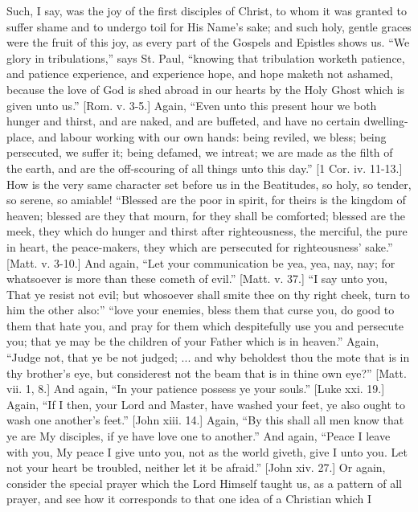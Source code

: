 Such, I say, was the joy of the first disciples of Christ, to whom
it was granted to suffer shame and to undergo toil for His Name's
sake; and such holy, gentle graces were the fruit of this joy, as
every part of the Gospels and Epistles shows us. ``We glory in
tribulations,'' says St. Paul, ``knowing that tribulation
worketh patience, and patience experience, and experience hope, and
hope maketh not ashamed, because the love of God is shed abroad in our
hearts by the Holy Ghost which is given unto us.'' [Rom. v. 3-5.]
Again, ``Even unto this present hour we both hunger and thirst,
and are naked, and are buffeted, and have no certain dwelling-place,
and labour working with our own hands: being reviled, we bless; being
persecuted, we suffer it; being defamed, we intreat; we are made as
the filth of the earth, and are the off-scouring of all things unto
this day.'' [1 Cor. iv. 11-13.] How is the very same character set
before us in the Beatitudes, so holy, so tender, so serene, so
amiable! ``Blessed are the poor in spirit, for theirs is the
kingdom of heaven; blessed are they that mourn, for they shall be
comforted; blessed are the meek, they which do hunger and thirst after
righteousness, the merciful, the pure in heart, the peace-makers, they
which are persecuted for righteousness' sake.'' [Matt. v. 3-10.]
And again, ``Let your communication be yea, yea, nay, nay; for
whatsoever is more than these cometh of evil.'' [Matt. v. 37.]
``I say unto you, That ye resist not evil; but whosoever shall
smite thee on thy right cheek, turn to him the other also:''
``love your enemies, bless them that curse you, do good to them
that hate you, and pray for them which despitefully use you and
persecute you; that ye may be the children of your Father which is in
heaven.'' Again, ``Judge not, that ye be not judged; ... and
why beholdest thou the mote that is in thy brother's eye, but
considerest not the beam that is in thine own eye?'' [Matt. vii.
1, 8.] And again, ``In your patience possess ye your souls.''
[Luke xxi. 19.] Again, ``If I then, your Lord and Master, have
washed your feet, ye also ought to wash one another's feet.''
[John xiii. 14.] Again, ``By this shall all men know that ye are
My disciples, if ye have love one to another.'' And again,
``Peace I leave with you, My peace I give unto you, not as the
world giveth, give I unto you. Let not your heart be troubled, neither
let it be afraid.'' [John xiv. 27.] Or again, consider the special
prayer which the Lord Himself taught us, as a pattern of all prayer,
and see how it corresponds to that one idea of a Christian which I
